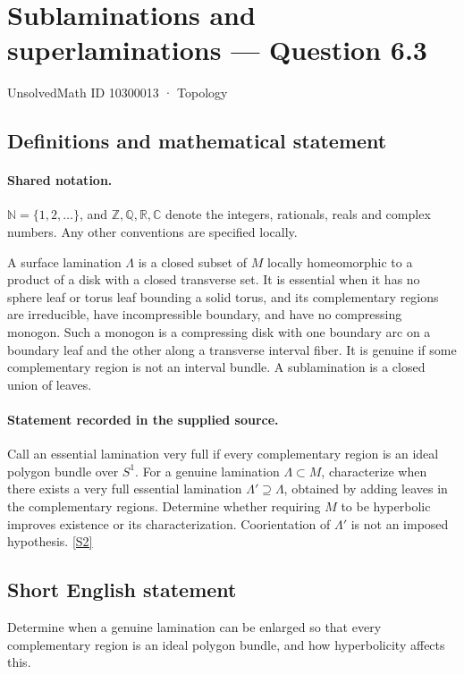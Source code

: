 \documentclass[11pt]{article}
\newcommand{\sref}[2]{\hyperlink{source:#1:#2}{[S#2]}}
\begin{document}
\setcounter{section}{10300012}
\section{Sublaminations and superlaminations — Question 6.3}\label{10300013}
{\small\sffamily UnsolvedMath ID 10300013 · Topology}
\subsection{Definitions and mathematical statement}

\paragraph{Shared notation.}$\mathbb N=\{1,2,\ldots\}$, and $\mathbb Z,\mathbb Q,\mathbb R,\mathbb C$ denote the integers, rationals, reals and complex numbers. Any other conventions are specified locally.


A surface lamination $\Lambda$ is a closed subset of $M$ locally homeomorphic to a product of a disk with a closed transverse set. It is essential when it has no sphere leaf or torus leaf bounding a solid torus, and its complementary regions are irreducible, have incompressible boundary, and have no compressing monogon. Such a monogon is a compressing disk with one boundary arc on a boundary leaf and the other along a transverse interval fiber. It is genuine if some complementary region is not an interval bundle. A sublamination is a closed union of leaves.
\paragraph{Statement recorded in the supplied source.}
Call an essential lamination very full if every complementary region is an ideal polygon bundle over $S^1$. For a genuine lamination $\Lambda\subset M$, characterize when there exists a very full essential lamination $\Lambda'\supseteq\Lambda$, obtained by adding leaves in the complementary regions. Determine whether requiring $M$ to be hyperbolic improves existence or its characterization. Coorientation of $\Lambda'$ is not an imposed hypothesis. \sref{10300013}{2}
\subsection{Short English statement}
Determine when a genuine lamination can be enlarged so that every complementary region is an ideal polygon bundle, and how hyperbolicity affects this.
\end{document}

